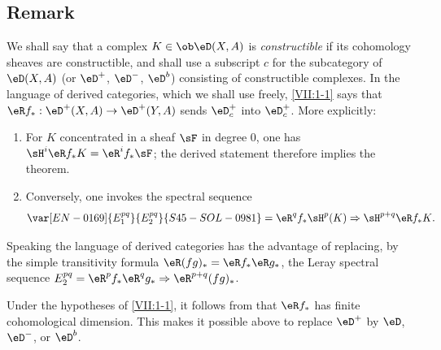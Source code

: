 \subsection{Remark}\label{VII:1-3}

We shall say that a complex $K\in\ob\eD(X,A)$ is \emph{constructible} if its
cohomology sheaves are constructible, and shall use a subscript $c$ for the
subcategory of $\eD(X,A)$ (or $\eD^+$, $\eD^-$, $\eD^b$) consisting of
constructible complexes. In the language of derived categories, which we
shall use freely, \ref{VII:1-1} says that
$\eR f_\ast:\eD^+(X,A) \to \eD^+(Y,A)$ sends $\eD_c^+$ into $\eD_c^+$.
More explicitly:
\begin{enumerate}[\indent a)]
  \item For $K$ concentrated in a sheaf $\sF$ in degree $0$, one has
    $\sH^i\eR f_\ast K = \eR^i f_\ast \sF$; the derived statement therefore
    implies the theorem.
  \item Conversely, one invokes the spectral sequence
    \[
      \var[EN-0169]{E_1^{p q}}{E_2^{p q}}{S45-SOL-0981} = \eR^q f_\ast \sH^p(K) \Rightarrow \sH^{p+q} \eR f_\ast K \text{.}
    \]
\end{enumerate}

Speaking the language of derived categories has the advantage of replacing,
by the simple transitivity formula $\eR(f g)_\ast = \eR f_\ast \eR g_\ast$,
the Leray spectral sequence
$E_2^{p q} = \eR^p f_\ast \eR^q g_\ast \Rightarrow \eR^{p+q} (f g)_\ast$.

Under the hypotheses of \ref{VII:1-1}, it follows from  that
$\eR f_\ast$ has finite cohomological dimension. This makes it possible above
to replace $\eD^+$ by $\eD$, $\eD^-$, or $\eD^b$.






